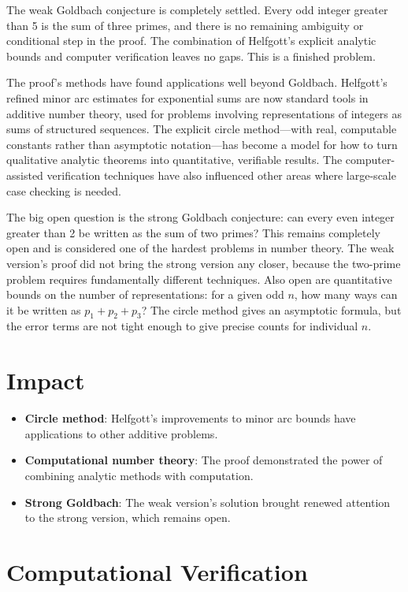 The weak Goldbach conjecture is completely settled. Every odd integer greater than 5 is the sum of three primes, and there is no remaining ambiguity or conditional step in the proof. The combination of Helfgott's explicit analytic bounds and computer verification leaves no gaps. This is a finished problem.

The proof's methods have found applications well beyond Goldbach. Helfgott's refined minor arc estimates for exponential sums are now standard tools in additive number theory, used for problems involving representations of integers as sums of structured sequences. The explicit circle method---with real, computable constants rather than asymptotic notation---has become a model for how to turn qualitative analytic theorems into quantitative, verifiable results. The computer-assisted verification techniques have also influenced other areas where large-scale case checking is needed.

The big open question is the strong Goldbach conjecture: can every even integer greater than 2 be written as the sum of two primes? This remains completely open and is considered one of the hardest problems in number theory. The weak version's proof did not bring the strong version any closer, because the two-prime problem requires fundamentally different techniques. Also open are quantitative bounds on the number of representations: for a given odd $n$, how many ways can it be written as $p_1 + p_2 + p_3$? The circle method gives an asymptotic formula, but the error terms are not tight enough to give precise counts for individual $n$.

\section{Impact}

\begin{itemize}
\item \textbf{Circle method}: Helfgott's improvements to minor arc bounds have applications to other additive problems.
\item \textbf{Computational number theory}: The proof demonstrated the power of combining analytic methods with computation.
\item \textbf{Strong Goldbach}: The weak version's solution brought renewed attention to the strong version, which remains open.
\end{itemize}

\section{Computational Verification}

